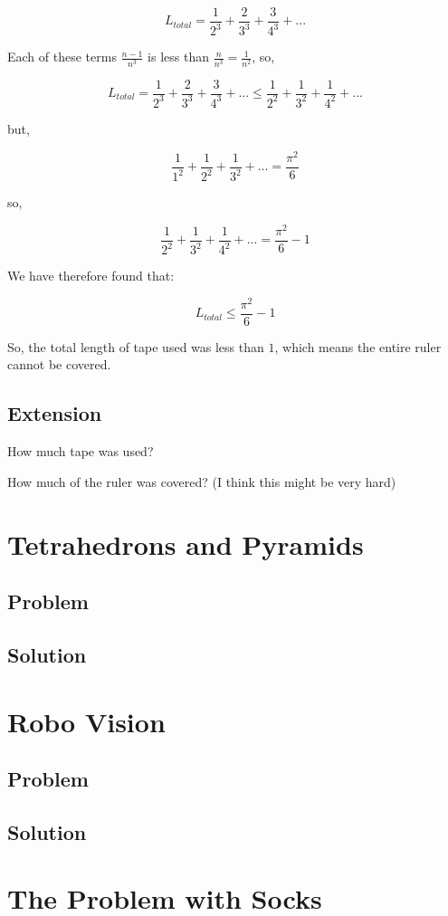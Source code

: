 \documentclass{book}
\begin{document}
\[L_{total}=\frac{1}{2^3}+\frac{2}{3^3}+\frac{3}{4^3}+...\]

Each of these terms \(\frac{n-1}{n^3}\) is less than \(\frac{n}{n^3}=\frac{1}{n^2}\), so,

\[L_{total}=\frac{1}{2^3}+\frac{2}{3^3}+\frac{3}{4^3}+...\leq \frac{1}{2^2}+\frac{1}{3^2}+\frac{1}{4^2}+...\]

but,

\[\frac{1}{1^2}+\frac{1}{2^2}+\frac{1}{3^2}+...=\frac{\pi^2}{6}\]

so,

\[\frac{1}{2^2}+\frac{1}{3^2}+\frac{1}{4^2}+...=\frac{\pi^2}{6}-1\]

We have therefore found that:

\[L_{total} \leq \frac{\pi^2}{6}-1\]

So, the total length of tape used was less than \(1\), which means the entire ruler cannot be covered.
\subsection{Extension}
How much tape was used?

How much of the ruler was covered? (I think this might be very hard)


\newpage

\section{Tetrahedrons and Pyramids}
\subsection{Problem}
\subsection{Solution}
\newpage

\section{Robo Vision}
\subsection{Problem}
\subsection{Solution}
\newpage


\section{The Problem with Socks}
\end{document}
